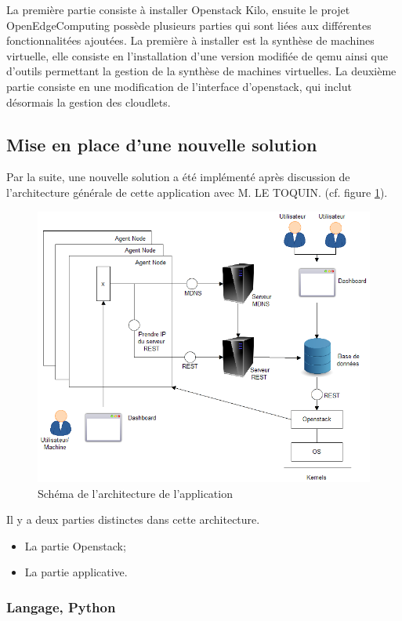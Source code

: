 \documentclass[twocolumn,a4paper]{IEEEtranfr}
\begin{document}
La première partie consiste à installer Openstack Kilo, ensuite le projet OpenEdgeComputing possède plusieurs parties qui sont liées aux différentes fonctionnalitées ajoutées. La première à installer est la synthèse de machines virtuelle, elle consiste en l’installation d’une version modifiée de qemu ainsi que d’outils permettant la gestion de la synthèse de machines virtuelles.
La deuxième partie consiste en une modification de l’interface d’openstack, qui inclut désormais la gestion des cloudlets.

\subsection{Mise en place d'une nouvelle solution}


Par la suite, une nouvelle solution a été implémenté après discussion de l’architecture générale de cette application avec M. LE TOQUIN. (cf. figure \ref{fig:architecture}).

\begin{figure}[htpb]
  \begin{center}
    \includegraphics[width=0.7\columnwidth] {../images/schema_architecture.png}
  \end{center}
  \caption{Schéma de l'architecture de l'application  }
  \label{fig:architecture}
\end{figure}

Il y a deux parties distinctes dans cette architecture.

\begin{itemize}
\item La partie Openstack;
\item La partie applicative.
\end{itemize}

\subsubsection{Langage, Python}
\end{document}
